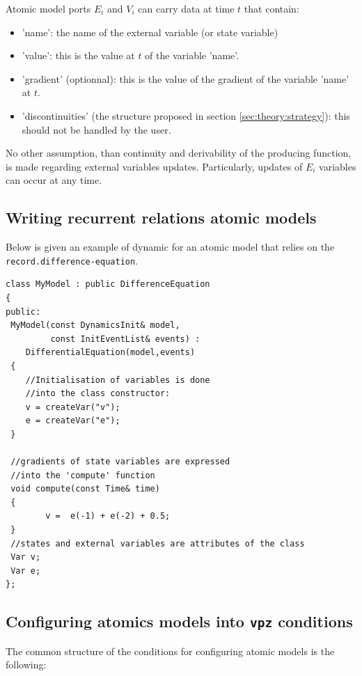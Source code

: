 \documentclass{article}
\theoremstyle{remark}
\begin{document}
Atomic model ports $E_i$ and $V_i$ can carry data at time $t$ that contain:
\begin{itemize}
  \item 'name': the name of the external variable (or state variable)
  \item 'value': this is the value at $t$ of the variable 'name'.
  \item 'gradient' (optionnal): this is the value of the gradient of
  the variable 'name' at $t$.
  \item 'discontinuities' (the structure proposed in
  section \ref{sec:theory:strategy}): this should not be handled by the user.
\end{itemize} 
No other assumption, than continuity and derivability of the producing
function, is made regarding external variables updates. Particularly, updates of
$E_i$ variables can occur at any time.

\subsection{Writing recurrent relations atomic models}
\label{sec:user:diff}

Below is given an example of dynamic for an atomic model that relies 
on the {\tt record.difference-equation}.

\begin{lstlisting}
class MyModel : public DifferenceEquation
{
public:
 MyModel(const DynamicsInit& model,
	     const InitEventList& events) :
    DifferentialEquation(model,events)
 {
 	//Initialisation of variables is done 
 	//into the class constructor:
	v = createVar("v");
	e = createVar("e");
 }
 
 //gradients of state variables are expressed 
 //into the 'compute' function 
 void compute(const Time& time)
 {
    	v =  e(-1) + e(-2) + 0.5;
 }
 //states and external variables are attributes of the class
 Var v;
 Var e;
};
\end{lstlisting}

\subsection{Configuring atomics models into {\tt vpz} conditions}
\label{sec:user:conf}

The common structure of the conditions for configuring atomic models is the
following:
\end{document}
